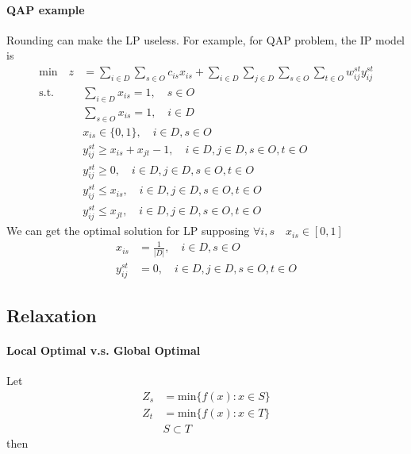             \paragraph{QAP example}
                Rounding can make the LP useless. For example, for QAP problem, the IP model is
                \begin{align*}
                    \text{min} \quad z &= \sum_{i\in D} \sum_{s\in O} c_{is} x_{is} + \sum_{i\in D} \sum_{j \in D} \sum_{s \in O} \sum_{t\in O} w_{ij}^{st}y_{ij}^{st}  \\
                    \text{s.t.} \quad & \sum_{i \in D} x_{is} =1, \quad s\in O  \\
                                &\sum_{s \in O} x_{is} = 1, \quad i \in D  \\
                                &x_{is} \in \{0, 1\}, \quad i \in D, s\in O  \\
                                & y_{ij}^{st} \ge x_{is} + x_{jt} - 1, \quad i\in D, j\in D, s\in O, t \in O  \\
                                & y_{ij}^{st} \ge 0, \quad i\in D, j\in D, s\in O, t \in O  \\
                                & y_{ij}^{st} \le x_{is}, \quad i\in D, j\in D, s\in O, t \in O  \\
                                & y_{ij}^{st} \le x_{jt}, \quad i\in D, j\in D, s\in O, t \in O  
                \end{align*}
                We can get the optimal solution for LP supposing $\forall i, s \quad x_{is}\in [0, 1]$
                \begin{align*}
                    x_{is} &= \frac{1}{|D|}, \quad i \in D, s\in O   \\
                    y_{ij}^{st} & = 0, \quad i\in D, j\in D, s\in O, t \in O 
                \end{align*}
               
        \subsection{Relaxation}

            \paragraph{Local Optimal v.s. Global Optimal}
                Let 
                \begin{align*}
                    Z_s &= \text{min} \{f(x):x\in S\} \\
                    Z_t &= \text{min} \{f(x):x\in T\}  \\
                    & S \subset T 
                \end{align*}
                then

